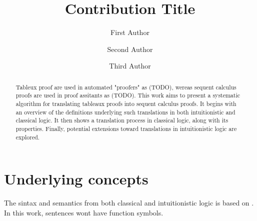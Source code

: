 \documentclass[runningheads]{llncs}
\begin{document}
%
\title{Contribution Title}
%
%
\author{First Author \and
Second Author \and
Third Author}
%
%
%
\maketitle              %
%
\begin{abstract}
Tableux proof are used in automated  "proofers" as (TODO), wereas sequent calculus 
proofs are used in proof assitants as (TODO). This work aims to present a systematic 
algorithm for translating tableaux proofs into sequent calculus proofs.
It begins with an overview of the definitions underlying such translations 
in both intuitionistic and classical logic.
 It then shows a translation process in classical logic, along with its properties. 
 Finally, potential extensions toward translations in intuitionistic logic are explored.
\end{abstract}
%
%
%
\section{Underlying concepts}
The sintax and semantics from both classical and intuitionistic logic is based on \cite{book2}. 
In this work, sentences wont have function symbols.
\end{document}
